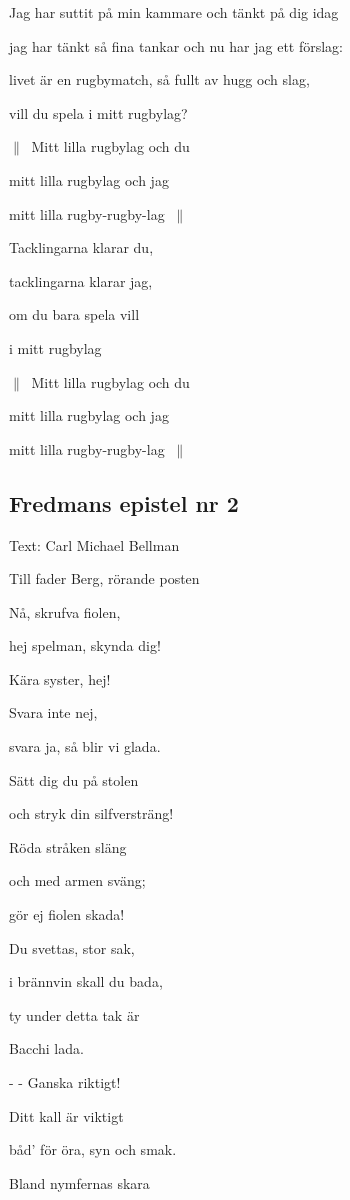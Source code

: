 Jag har suttit på min kammare och tänkt på dig idag

jag har tänkt så fina tankar och nu har jag ett förslag:

livet är en rugbymatch, så fullt av hugg och slag,

vill du spela i mitt rugbylag?\bigskip

$\|\:$ Mitt lilla rugbylag och du

mitt lilla rugbylag och jag

mitt lilla rugby-rugby-lag $\:\|$\bigskip

Tacklingarna klarar du,

tacklingarna klarar jag,

om du bara spela vill

i mitt rugbylag\bigskip

$\|\:$ Mitt lilla rugbylag och du

mitt lilla rugbylag och jag

mitt lilla rugby-rugby-lag $\:\|$\bigskip

\subsection{\textbf{Fredmans epistel nr 2 }}

Text:  Carl Michael Bellman

Till fader Berg, rörande posten\bigskip

Nå, skrufva fiolen,

hej spelman, skynda dig!

Kära syster, hej!

Svara inte nej,

svara ja, så blir vi glada.

Sätt dig du på stolen

och stryk din silfversträng!

Röda stråken släng

och med armen sväng;

gör ej fiolen skada!

Du svettas, stor sak,

i brännvin skall du bada,

ty under detta tak är

Bacchi lada.

- - Ganska riktigt!

Ditt kall är viktigt

båd’ för öra, syn och smak.\bigskip

Bland nymfernas skara

